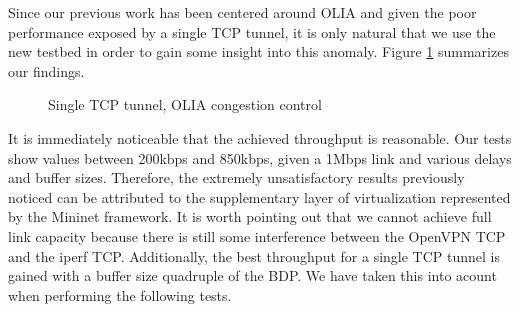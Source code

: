 Since our previous work has been centered around OLIA and given the poor
performance exposed by a single TCP tunnel, it is only natural that we use the
new testbed in order to gain some insight into this anomaly. Figure
\ref{fig:olia-tcp} summarizes our findings.

\begin{figure}[H]
  \centering

  \caption{Single TCP tunnel, OLIA congestion control}
  \label{fig:olia-tcp}
\end{figure}

It is immediately noticeable that the achieved throughput is reasonable. Our
tests show values between 200kbps and 850kbps, given a 1Mbps link and various
delays and buffer sizes. Therefore, the extremely unsatisfactory results
previously noticed can be attributed to the supplementary layer of
virtualization represented by the Mininet framework. It is worth pointing out
that we cannot achieve full link capacity because there is still some
interference between the OpenVPN TCP and the iperf TCP. Additionally, the best
throughput for a single TCP tunnel is gained with a buffer size quadruple of
the BDP. We have taken this into acount when performing the following tests.

